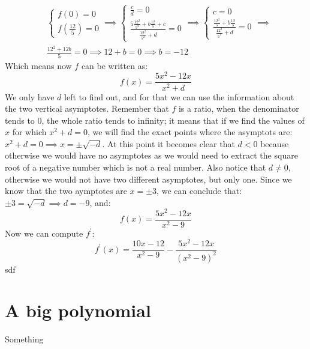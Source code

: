 \begin{equation*}
    \begin{split}
        &\begin{cases}
            f(0) = 0\\
            f\left( \frac{12}{5} \right) = 0
        \end{cases}
        \implies
        \begin{cases}
            \frac{c}{d} = 0\\
            \frac{5\frac{12^2}{5^2} + b\frac{12}{5} + c}{\frac{12^2}{5^2} + d} = 0
        \end{cases}
        \implies
        \begin{cases}
            c = 0\\
            \frac{\frac{12^2}{5} + b\frac{12}{5}}{\frac{12^2}{5^2} + d} = 0
        \end{cases}
        \implies\\
        &\frac{12^2 + 12b}{5} = 0 \implies
        12 + b = 0 \implies
        b = -12
    \end{split}
\end{equation*}
Which means now $f$ can be written as:
\begin{equation*}
    f(x) = \frac{5x^2 - 12x}{x^2 + d}
\end{equation*}
We only have $d$ left to find out, and for that we can use the information about
the two vertical asymptotes. Remember that $f$ is a ratio, when the denominator
tends to 0, the whole ratio tends to infinity; it means that if we find the
values of $x$ for which $x^2 + d = 0$, we will find the exact points where
the asymptots are: $x^2 + d = 0 \implies x = \pm \sqrt{-d}$. At this point
it becomes clear that $d < 0$ because otherwise we would have no asymptotes as
we would need to extract the square root of a negative number which is not a
real number.
Also notice that $d \neq 0$, otherwise we would not have two different
asymptotes, but only one. Since we know that the two aymptotes are $x = \pm 3$,
we can conclude that: $\pm 3 = \sqrt{-d} \implies d = -9$, and:
\begin{equation*}
    f(x) = \frac{5x^2 - 12x}{x^2 - 9}
\end{equation*}
Now we can compute $f^\prime$:
\begin{equation*}
    f^\prime(x) = \frac{10x - 12}{x^2 - 9} - \frac{5x^2 - 12x}{(x^2 - 9)^2}
\end{equation*}
sdf

\section{A big polynomial}
\label{sec:bigpoly}
Something

